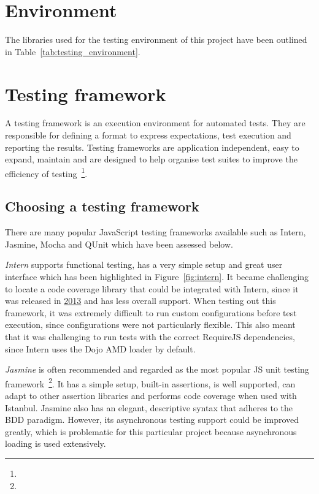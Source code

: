 \section{Environment} {
\label{sec:testing_environment}

	The libraries used for the testing environment of this project have been outlined in Table~\ref{tab:testing_environment}.

	

}

\section{Testing framework} {
\label{sec:testing_framework}

	A testing framework is an execution environment for automated tests. They are responsible for defining a format to express expectations, test execution and reporting the results. Testing frameworks are application independent, easy to expand, maintain and are designed to help organise test suites to improve the efficiency of testing~\footnote{}.

	\subsection{Choosing a testing framework} {
	\label{sec:choosing_a_testing_framework}

		There are many popular JavaScript testing frameworks available such as Intern, Jasmine, Mocha and QUnit which have been assessed below.

		\emph{Intern} supports functional testing, has a very simple setup and great user interface which has been highlighted in Figure~\ref{fig:intern}. It became challenging to locate a code coverage library that could be integrated with Intern, since it was released in \href{https://github.com/theintern}{2013} and has less overall support. When testing out this framework, it was extremely difficult to run custom configurations before test execution, since configurations were not particularly flexible. This also meant that it was challenging to run tests with the correct RequireJS dependencies, since Intern uses the Dojo AMD loader by default.

		

		\emph{Jasmine} is often recommended and regarded as the most popular JS unit testing framework~\footnote{}. It has a simple setup, built-in assertions, is well supported, can adapt to other assertion libraries and performs code coverage when used with Istanbul. Jasmine also has an elegant, descriptive syntax that adheres to the BDD paradigm. However, its asynchronous testing support could be improved greatly, which is problematic for this particular project because asynchronous loading is used extensively.

}}
